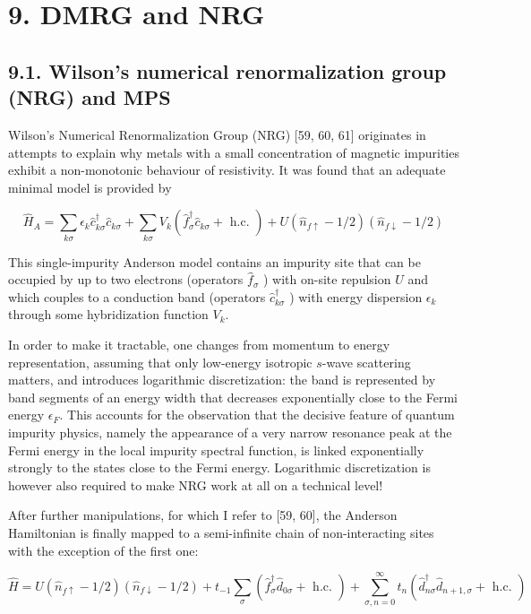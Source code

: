 \documentclass[12pt]{article}
\begin{document}
\section*{9. DMRG and NRG}
\subsection*{9.1. Wilson's numerical renormalization group (NRG) and MPS}
Wilson's Numerical Renormalization Group (NRG) [59, 60, 61] originates in attempts to explain why metals with a small concentration of magnetic impurities exhibit a non-monotonic behaviour of resistivity. It was found that an adequate minimal model is provided by


\begin{equation*}
\hat{H}_{A}=\sum_{k \sigma} \epsilon_{k} \hat{c}_{k \sigma}^{\dagger} \hat{c}_{k \sigma}+\sum_{k \sigma} V_{k}\left(\hat{f}_{\sigma}^{\dagger} \hat{c}_{k \sigma}+\text { h.c. }\right)+U\left(\hat{n}_{f \uparrow}-1 / 2\right)\left(\hat{n}_{f \downarrow}-1 / 2\right) \tag{319}
\end{equation*}


This single-impurity Anderson model contains an impurity site that can be occupied by up to two electrons (operators $\hat{f}_{\sigma}^{\hat{}}$ ) with on-site repulsion $U$ and which couples to a conduction band (operators $\hat{c}_{k \sigma}^{\dagger}$ ) with energy dispersion $\epsilon_{k}$ through some hybridization function $V_{k}$.

In order to make it tractable, one changes from momentum to energy representation, assuming that only low-energy isotropic $s$-wave scattering matters, and introduces logarithmic discretization: the band is represented by band segments of an energy width that decreases exponentially close to the Fermi energy $\epsilon_{F}$. This accounts for the observation that the decisive feature of quantum impurity physics, namely the appearance of a very narrow resonance peak at the Fermi energy in the local impurity spectral function, is linked exponentially strongly to the states close to the Fermi energy. Logarithmic discretization is however also required to make NRG work at all on a technical level!

After further manipulations, for which I refer to [59, 60], the Anderson Hamiltonian is finally mapped to a semi-infinite chain of non-interacting sites with the exception of the first one:


\begin{equation*}
\hat{H}=U\left(\hat{n}_{f \uparrow}-1 / 2\right)\left(\hat{n}_{f \downarrow}-1 / 2\right)+t_{-1} \sum_{\sigma}\left(\hat{f}_{\sigma}^{\dagger} \hat{d}_{0 \sigma}+\text { h.c. }\right)+\sum_{\sigma, n=0}^{\infty} t_{n}\left(\hat{d}_{n \sigma}^{\dagger} \hat{d}_{n+1, \sigma}+\text { h.c. }\right) \tag{320}
\end{equation*}
\end{document}
